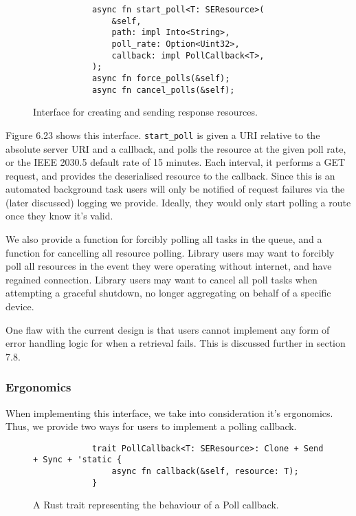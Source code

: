 \begin{figure}[h]
    \begin{center}
        \begin{lstlisting}
            async fn start_poll<T: SEResource>(
                &self,
                path: impl Into<String>,
                poll_rate: Option<Uint32>,
                callback: impl PollCallback<T>,
            );
            async fn force_polls(&self);
            async fn cancel_polls(&self);
        \end{lstlisting}
        \label{fig:pollinterface}
        \vspace{-10pt}
        \caption{Interface for creating and sending response resources.}
    \end{center}
\end{figure}

Figure 6.23 shows this interface. \texttt{start\_poll} is given a URI relative to the absolute server URI and a callback, and polls the resource at the given poll rate, or the IEEE 2030.5 default rate of 15 minutes. Each interval, it performs a GET request, and provides the deserialised resource to the callback. Since this is an automated background task users will only be notified of request failures via the (later discussed) logging we provide. Ideally, they would only start polling a route once they know it's valid.

We also provide a function for forcibly polling all tasks in the queue, and a function for cancelling all resource polling. Library users may want to forcibly poll all resources in the event they were operating without internet, and have regained connection. Library users may want to cancel all poll tasks when attempting a graceful shutdown, no longer aggregating on behalf of a specific device.

One flaw with the current design is that users cannot implement any form of error handling logic for when a retrieval fails. This is discussed further in section 7.8.

\subsubsection{Ergonomics}
When implementing this interface, we take into consideration it's ergonomics. Thus, we provide two ways for users to implement a polling callback.


\begin{figure}[h]
    \begin{center}
        \begin{lstlisting}
            trait PollCallback<T: SEResource>: Clone + Send + Sync + 'static {
                async fn callback(&self, resource: T);
            }
        \end{lstlisting}
        \label{fig:polltrait}
        \vspace{-10pt}
        \caption{A Rust trait representing the behaviour of a Poll callback.}
    \end{center}
\end{figure}

